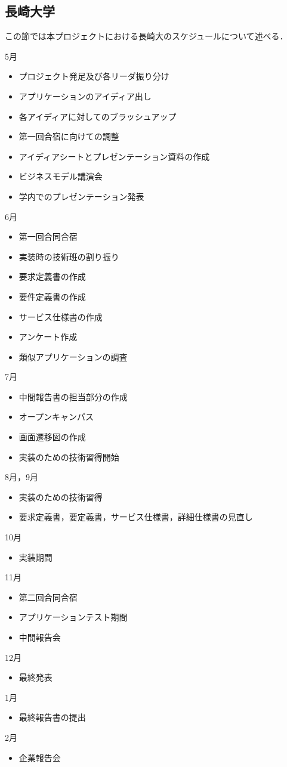 \subsection{長崎大学}
\par
この節では本プロジェクトにおける長崎大のスケジュールについて述べる．
\par
5月
\begin{itemize}
\item プロジェクト発足及び各リーダ振り分け
\item アプリケーションのアイディア出し
\item 各アイディアに対してのブラッシュアップ
\item 第一回合宿に向けての調整
\item アイディアシートとプレゼンテーション資料の作成
\item ビジネスモデル講演会
\item 学内でのプレゼンテーション発表
\end{itemize}
6月
\begin{itemize}
\item 第一回合同合宿
\item 実装時の技術班の割り振り
\item 要求定義書の作成
\item 要件定義書の作成
\item サービス仕様書の作成
\item アンケート作成
\item 類似アプリケーションの調査
\end{itemize}
7月
\begin{itemize}
\item 中間報告書の担当部分の作成
\item オープンキャンパス
\item 画面遷移図の作成
\item 実装のための技術習得開始
\end{itemize}
8月，9月
\begin{itemize}
\item 実装のための技術習得
\item 要求定義書，要定義書，サービス仕様書，詳細仕様書の見直し
\end{itemize}
10月
\begin{itemize}
\item 実装期間
\end{itemize}
11月
\begin{itemize}
\item 第二回合同合宿
\item アプリケーションテスト期間
\item 中間報告会
\end{itemize}
12月
\begin{itemize}
\item 最終発表
\end{itemize}
1月
\begin{itemize}
\item 最終報告書の提出
\end{itemize}
2月
\begin{itemize}
\item 企業報告会
\end{itemize}

